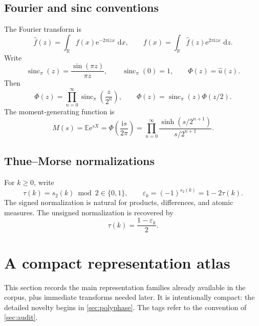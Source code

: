 \documentclass[11pt,oneside]{article}
\numberwithin{equation}{section}
\theoremstyle{definition}
\theoremstyle{remark}
\newcommand{\R}{\mathbb R}
\newcommand{\E}{\mathbb E}
\newcommand{\sincpi}{\operatorname{sinc}_{\pi}}
\newcommand{\dd}{\,\mathrm d}
\newcommand{\e}{\mathrm e}
\newcommand{\ii}{\mathrm i}
\newcommand{\eps}{\varepsilon}
\begin{document}
\subsection{Fourier and sinc conventions}

The Fourier transform is
\begin{equation}
 \widehat f(z)=\int_{\R}f(x)\e^{-2\pi\ii zx}\,\dd x,
 \qquad
 f(x)=\int_{\R}\widehat f(z)\e^{2\pi\ii zx}\,\dd z.       \label{eq:Fourier-convention}
\end{equation}
Write
\begin{equation}
 \sincpi(z)=\frac{\sin(\pi z)}{\pi z},\qquad \sincpi(0)=1,
 \qquad \Phi(z)=\widehat u(z).                             \label{eq:sinc-Phi}
\end{equation}
Then
\begin{equation}
 \Phi(z)=\prod_{n=0}^{\infty}\sincpi\!\left(\frac z{2^n}\right),
 \qquad
 \Phi(z)=\sincpi(z)\Phi(z/2).                              \label{eq:Phi-product-scale}
\end{equation}
The moment-generating function is
\begin{equation}
 M(s)=\E\e^{sX}=\Phi\!\left(\frac{\ii s}{2\pi}\right)
 =\prod_{n=0}^{\infty}
   \frac{\sinh(s/2^{n+1})}{s/2^{n+1}}.                    \label{eq:M-product}
\end{equation}

\subsection{Thue--Morse normalizations}

For $k\ge0$, write
\begin{equation}
 \tau(k)=s_2(k)\bmod2\in\{0,1\},
 \qquad
 \eps_k=(-1)^{s_2(k)}=1-2\tau(k).                          \label{eq:TM-normalizations}
\end{equation}
The signed normalization is natural for products, differences, and atomic
measures.  The unsigned normalization is recovered by
\begin{equation}
 \tau(k)=\frac{1-\eps_k}{2}.                               \label{eq:TM-bridge}
\end{equation}

\section{A compact representation atlas}
\label{sec:atlas}

This section records the main representation families already available in the
corpus, plus immediate transforms needed later.  It is intentionally compact:
the detailed novelty begins in \cref{sec:polyphase}.  The tags refer to the
convention of \cref{sec:audit}.
\end{document}
